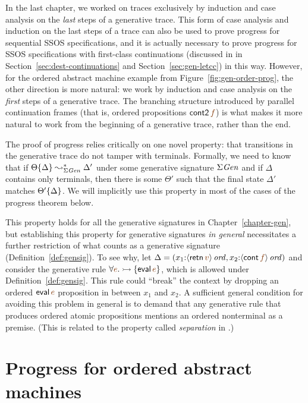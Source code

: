 In the last chapter, we worked on traces exclusively by induction and
case analysis on the {\it last} steps of a generative trace.  This
form of case analysis and induction on the last steps of a trace can
also be used to prove progress for sequential SSOS specifications, and
it is actually necessary to prove progress for SSOS specifications
with first-class continuations (discussed in in
Section~\ref{sec:dest-continuations} and Section~\ref{sec:gen-letcc})
in this way. However, for the ordered abstract machine example from
Figure~\ref{fig:gen-order-prog}, the other direction is more natural:
we work by induction and case analysis on the {\it first} steps of a
generative trace. The branching structure introduced by parallel
continuation frames (that is, ordered propositions ${\sf
  cont2}\,\lf{f}$) is what makes it more natural to work from the
beginning of a generative trace, rather than the end.

The proof of progress relies critically on one novel property: that
transitions in the generative trace do not tamper with terminals.
Formally, we need to know that if ${\Theta}\{{\Delta}\}
\leadsto^*_{\Sigma{\it Gen}} \Delta'$ under some generative signature
$\Sigma{\it Gen}$ and if $\Delta$ contains only terminals, then there
is some $\Theta'$ such that the final state $\Delta'$ matches
${\Theta'}\{{\Delta}\}$. We will implicitly use this property in
most of the cases of the progress theorem below.

This property holds for all the generative signatures in
Chapter~\ref{chapter-gen}, but establishing this property for
generative signatures {\it in general} necessitates a further
restriction of what counts as a generative signature
(Definition~\ref{def:gensig}). To see why, let $\Delta =
(x_1{:}\istrue{\susp{{\sf retn}\,\lf{v}}}, x_2{:}\istrue{\susp{{\sf
      cont}\,\lf{f}}})$ and consider the generative rule $\forall
\lf{e}. \lefti \{ {\sf eval}\,\lf{e} \}$, which is allowed under
Definition~\ref{def:gensig}. This rule could ``break'' the context by
dropping an ordered ${\sf eval}\,\lf{e}$ proposition in between $x_1$
and $x_2$. A sufficient general condition for avoiding this problem in
general is to demand that any generative rule that produces ordered
atomic propositions mentions an ordered nonterminal as a premise.
(This is related to the property called {\it separation} in 
\cite{simmons08linear}.)

\section{Progress for ordered abstract machines}

